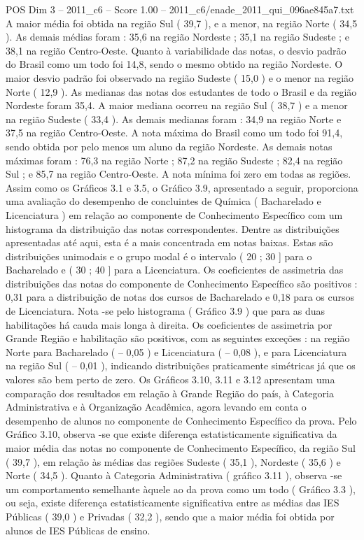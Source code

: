 \begin{textsample}{POS Dim 3 – 2011\_c6 – Score 1.00 – 2011\_c6/enade\_2011\_qui\_096ae845a7.txt}
A maior média foi obtida na região Sul ( 39,7 ), e a menor, na região Norte ( 34,5 ).
As demais médias foram : 35,6 na região Nordeste ; 35,1 na região Sudeste ; e 38,1 na região Centro-Oeste.
Quanto à variabilidade das notas, o desvio padrão do Brasil como um todo foi 14,8, sendo o mesmo obtido na região Nordeste.
O maior desvio padrão foi observado na região Sudeste ( 15,0 ) e o menor na região Norte ( 12,9 ).
As medianas das notas dos estudantes de todo o Brasil e da região Nordeste foram 35,4.
A maior mediana ocorreu na região Sul ( 38,7 ) e a menor na região Sudeste ( 33,4 ).
As demais medianas foram : 34,9 na região Norte e 37,5 na região Centro-Oeste.
A nota máxima do Brasil como um todo foi 91,4, sendo obtida por pelo menos um aluno da região Nordeste.
As demais notas máximas foram : 76,3 na região Norte ; 87,2 na região Sudeste ; 82,4 na região Sul ; e 85,7 na região Centro-Oeste.
A nota mínima foi zero em todas as regiões.
Assim como os Gráficos 3.1 e 3.5, o Gráfico 3.9, apresentado a seguir, proporciona uma avaliação do desempenho de concluintes de Química ( Bacharelado e Licenciatura ) em relação ao componente de Conhecimento Específico com um histograma da distribuição das notas correspondentes.
Dentre as distribuições apresentadas até aqui, esta é a mais concentrada em notas baixas.
Estas são distribuições unimodais e o grupo modal é o intervalo ( 20 ; 30 ] para o Bacharelado e ( 30 ; 40 ] para a Licenciatura.
Os coeficientes de assimetria das distribuições das notas do componente de Conhecimento Específico são positivos : 0,31 para a distribuição de notas dos cursos de Bacharelado e 0,18 para os cursos de Licenciatura.
Nota -se pelo histograma ( Gráfico 3.9 ) que para as duas habilitações há cauda mais longa à direita.
Os coeficientes de assimetria por Grande Região e habilitação são positivos, com as seguintes exceções : na região Norte para Bacharelado ( – 0,05 ) e Licenciatura ( – 0,08 ), e para Licenciatura na região Sul ( – 0,01 ), indicando distribuições praticamente simétricas já que os valores são bem perto de zero.
Os Gráficos 3.10, 3.11 e 3.12 apresentam uma comparação dos resultados em relação à Grande Região do país, à Categoria Administrativa e à Organização Acadêmica, agora levando em conta o desempenho de alunos no componente de Conhecimento Específico da prova.
Pelo Gráfico 3.10, observa -se que existe diferença estatisticamente significativa da maior média das notas no componente de Conhecimento Específico, da região Sul ( 39,7 ), em relação às médias das regiões Sudeste ( 35,1 ), Nordeste ( 35,6 ) e Norte ( 34,5 ).
Quanto à Categoria Administrativa ( gráfico 3.11 ), observa -se um comportamento semelhante àquele ao da prova como um todo ( Gráfico 3.3 ), ou seja, existe diferença estatisticamente significativa entre as médias das IES Públicas ( 39,0 ) e Privadas ( 32,2 ), sendo que a maior média foi obtida por alunos de IES Públicas de ensino.

\end{textsample}
